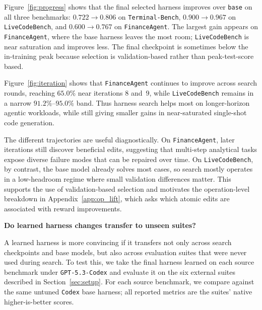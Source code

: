 \documentclass{article}
\begin{document}
Figure~\ref{fig:progress} shows that the final selected harness
improves over \texttt{base} on all three benchmarks:
$0.722\!\to\!0.806$ on \texttt{Terminal-Bench}, $0.900\!\to\!0.967$
on \texttt{LiveCodeBench}, and $0.600\!\to\!0.767$ on
\texttt{FinanceAgent}. The largest gain appears on
\texttt{FinanceAgent}, where the base harness leaves the most room;
\texttt{LiveCodeBench} is near saturation and improves less. The final
checkpoint is sometimes below the in-training peak because selection is
validation-based rather than peak-test-score based.

Figure~\ref{fig:iteration} shows that \texttt{FinanceAgent}
continues to improve across search rounds, reaching $65.0\%$ near iterations $8$
and~$9$, while \texttt{LiveCodeBench} remains in a narrow
$91.2\%$--$95.0\%$ band. Thus harness search helps most on longer-horizon
agentic workloads, while still giving smaller gains in near-saturated
single-shot code generation.

The different trajectories are useful diagnostically. On
\texttt{FinanceAgent}, later iterations still discover beneficial edits,
suggesting that multi-step analytical tasks expose diverse failure modes
that can be repaired over time. On \texttt{LiveCodeBench}, by contrast,
the base model already solves most cases, so search mostly operates in a
low-headroom regime where small validation differences matter. This
supports the use of validation-based selection and motivates the
operation-level breakdown in Appendix~\ref{app:op_lift}, which asks
which atomic edits are associated with reward improvements.

\noindent{}\hspace{0.45em}\textbf{Do learned harness changes transfer to unseen suites?}

A learned harness is more convincing if it transfers not only across
search checkpoints and base models, but also across evaluation suites
that were never used during search. To test this, we take the final
harness learned on each source benchmark under
\texttt{GPT-5.3-Codex} and evaluate it on the six external
suites described in Section~\ref{sec:setup}. For each source
benchmark, we compare against the same untuned \texttt{Codex} base
harness; all reported metrics are the suites' native higher-is-better
scores.
\end{document}

